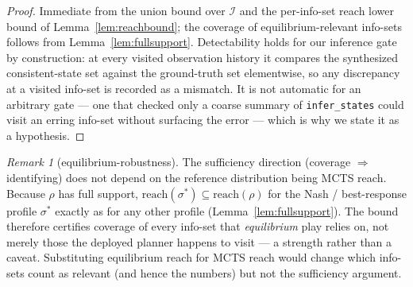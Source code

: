 \documentclass[11pt]{article}
\theoremstyle{remark}
\newtheorem{remark}{Remark}
\newcommand{\Ireach}{\mathcal{I}}
\begin{document}
\begin{proof}
Immediate from the union bound over $\Ireach$ and the per-info-set reach lower bound of Lemma~\ref{lem:reachbound}; the coverage of equilibrium-relevant info-sets follows from Lemma~\ref{lem:fullsupport}. Detectability holds for our inference gate by construction: at every visited observation history it compares the synthesized consistent-state set against the ground-truth set elementwise, so any discrepancy at a visited info-set is recorded as a mismatch. It is not automatic for an arbitrary gate --- one that checked only a coarse summary of \texttt{infer\_states} could visit an erring info-set without surfacing the error --- which is why we state it as a hypothesis.
\end{proof}

\begin{remark}[equilibrium-robustness]
The sufficiency direction (coverage $\Rightarrow$ identifying) does not depend on the reference distribution being MCTS reach. Because $\rho$ has full support, $\mathrm{reach}(\sigma^*) \subseteq \mathrm{reach}(\rho)$ for the Nash / best-response profile $\sigma^*$ exactly as for any other profile (Lemma~\ref{lem:fullsupport}). The bound therefore certifies coverage of every info-set that \emph{equilibrium} play relies on, not merely those the deployed planner happens to visit --- a strength rather than a caveat. Substituting equilibrium reach for MCTS reach would change which info-sets count as relevant (and hence the numbers) but not the sufficiency argument.
\end{remark}
\end{document}
